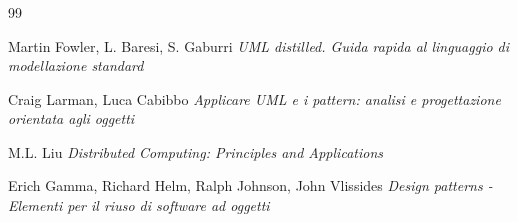 \documentclass[t]{beamer} %
\begin{document}
\begin {frame} 
 \frametitle {\refname}
  \begin {thebibliography}{99}
   {\tiny 
       Martin Fowler, L. Baresi, S. Gaburri 
     \newblock \emph{UML distilled. Guida rapida al linguaggio di modellazione standard} 

      Craig Larman, Luca Cabibbo
     \newblock \emph{Applicare UML e i pattern: analisi e progettazione orientata agli oggetti} 

      M.L. Liu
     \newblock \emph{Distributed Computing: Principles and Applications} 

      Erich Gamma, Richard Helm, Ralph Johnson, John Vlissides
     \newblock \emph{Design patterns - Elementi per il riuso di software ad oggetti} 
   }
   \end {thebibliography}
\end {frame}
\end{document}
